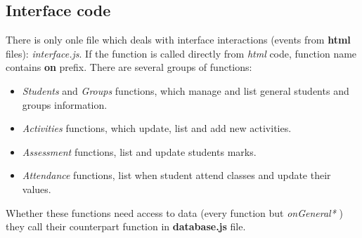 	\subsection{Interface code }
	There is only onle file which deals with interface interactions (events from {\bf html} files): \emph{ interface.js}.
If the function is called directly from \emph{html}	code, function name contains {\bf on} prefix.
There are several groups of functions:
\begin{itemize}
    \item \emph{Students} and \emph{Groups} functions, which manage and list general students and groups information.
    \item \emph{Activities} functions, which update, list and add new activities.
    \item \emph{Assessment} functions, list and update students marks.
    \item \emph{Attendance} functions, list when student attend classes and update their values.
\end{itemize}
Whether these functions need access to data (every function but \emph{ onGeneral* } ) they call  their counterpart 
function in {\bf database.js } file.


